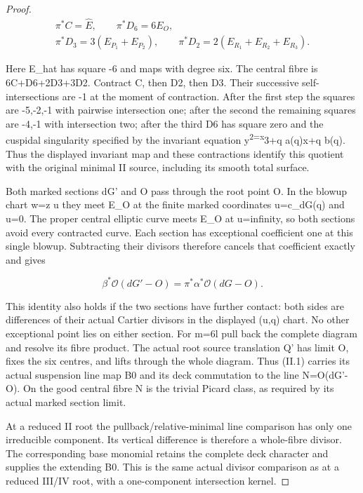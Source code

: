 \begin{proof}
\[
\begin{gathered}\pi^*C=\widehat E,\qquad\pi^*D_6=6E_O,\\ \pi^*D_3=3(E_{P_1}+E_{P_2}),\qquad\pi^*D_2=2(E_{R_1}+E_{R_2}+E_{R_3}).\end{gathered}
\]

Here E\_hat has square -6 and maps with degree six. The central
fibre is 6C+D6+2D3+3D2. Contract C, then D2, then D3. Their
successive self-intersections are -1 at the moment of contraction.
After the first step the squares are -5,-2,-1 with pairwise
intersection one; after the second the remaining squares are
-4,-1 with intersection two; after the third D6 has square zero
and the cuspidal singularity specified by the invariant equation
y\textsuperscript{2=x}3+q a(q)x+q b(q). Thus the displayed invariant map and
these contractions identify this quotient with the original
minimal II source, including its smooth total surface.

Both marked sections dG' and O pass through the root point O.
In the blowup chart w=z u they meet E\_O at the finite marked
coordinates u=c\_dG(q) and u=0. The proper central elliptic
curve meets E\_O at u=infinity, so both sections avoid every
contracted curve. Each section has exceptional coefficient one
at this single blowup. Subtracting their divisors therefore
cancels that coefficient exactly and gives

\[
\beta^*\mathcal O(dG'-O)=\pi^*\alpha^*\mathcal O(dG-O).\tag{II.1}
\]

This identity also holds if the two sections have further
contact: both sides are differences of their actual Cartier
divisors in the displayed (u,q) chart. No other exceptional
point lies on either section. For m=6l pull back the complete
diagram and resolve its fibre product. The actual root source
translation Q' has limit O, fixes the six centres, and lifts
through the whole diagram. Thus (II.1) carries its actual
suspension line map B0 and its deck commutation to the line
N=O(dG'-O). On the good central fibre N is the trivial Picard
class, as required by its actual marked section limit.

At a reduced II root the pullback/relative-minimal line comparison
has only one irreducible component. Its vertical difference is
therefore a whole-fibre divisor. The corresponding base monomial
retains the complete deck character and supplies the extending
B0. This is the same actual divisor comparison as at a reduced
III/IV root, with a one-component intersection kernel.


\end{proof}
